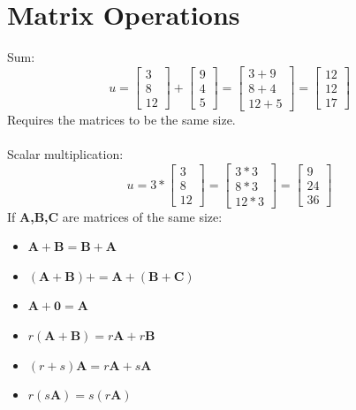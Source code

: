 \documentclass[nobib]{tufte-handout}
\begin{document}
\section{Matrix Operations}
Sum:\\
\begin{equation*}
    u =
    \begin{bmatrix}
        3 \\
        8 \\
        12
    \end{bmatrix}
    +
    \begin{bmatrix}
        9 \\
        4 \\
        5
    \end{bmatrix}
    =
    \begin{bmatrix}
        3+9 \\
        8+4 \\
        12+5
    \end{bmatrix} =
    \begin{bmatrix}
        12 \\
        12 \\
        17
    \end{bmatrix}
\end{equation*}
Requires the matrices to be the same size.\\~\\
Scalar multiplication:
\begin{equation*}
    u = 3*
    \begin{bmatrix}
        3 \\
        8 \\
        12
    \end{bmatrix}
    =
    \begin{bmatrix}
        3*3 \\
        8*3 \\
        12*3
    \end{bmatrix} =
    \begin{bmatrix}
        9  \\
        24 \\
        36
    \end{bmatrix}
\end{equation*}
If \textbf{A,B,C} are matrices of the same size:\
\begin{itemize}
    \item $\mathbf{A+B=B+A}$
    \item $\mathbf{(A+B)+=A+(B+C)}$
    \item $\mathbf{A+0=A}$
    \item $r\mathbf{(A+B)=}r\mathbf{A}+r\mathbf{B}$
    \item $(r+s)\mathbf{A=}r\mathbf{A}+s\mathbf{A}$
    \item $r(s\mathbf{A}) = s(r\mathbf{A})$
\end{itemize}
\end{document}
